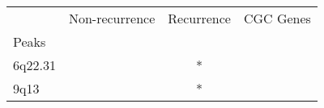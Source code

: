 \begin{tabular}{lccr}
\toprule
{} & Non-recurrence & Recurrence & CGC Genes \\
Peaks   &                &            &           \\
\midrule
6q22.31 &                &          * &           \\
9q13    &                &          * &           \\
\bottomrule
\end{tabular}
